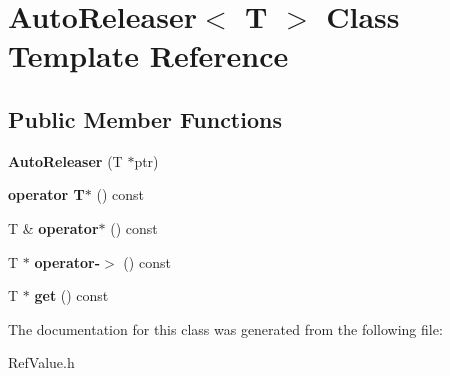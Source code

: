 \hypertarget{class_auto_releaser}{}\section{Auto\+Releaser$<$ T $>$ Class Template Reference}
\label{class_auto_releaser}
\subsection*{Public Member Functions}
\begin{DoxyCompactItemize}
\item 
\mbox{\label{class_auto_releaser_ac7fc97174eab7ded0c1b7f6a28d55ce5}} 
{\bfseries Auto\+Releaser} (T $\ast$ptr)
\item 
\mbox{\label{class_auto_releaser_ae4a4320a541ac0b6a9bcf463ac810443}} 
{\bfseries operator T$\ast$} () const
\item 
\mbox{\label{class_auto_releaser_ad12e1c7bf842435b74d724fc695a06d7}} 
T \& {\bfseries operator$\ast$} () const
\item 
\mbox{\label{class_auto_releaser_ad9f04ccd59cf5b6d15e264154b767d16}} 
T $\ast$ {\bfseries operator-\/$>$} () const
\item 
\mbox{\label{class_auto_releaser_a25dde5c22344c9060062c2d9adafb00d}} 
T $\ast$ {\bfseries get} () const
\end{DoxyCompactItemize}


The documentation for this class was generated from the following file\+:\begin{DoxyCompactItemize}
\item 
Ref\+Value.\+h\end{DoxyCompactItemize}
